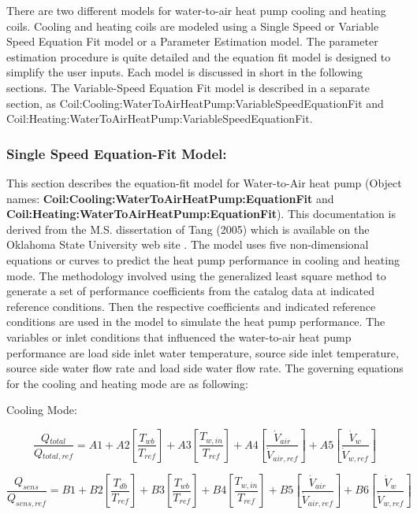 There are two different models for water-to-air heat pump cooling and heating coils. Cooling and heating coils are modeled using a Single Speed or Variable Speed Equation Fit model or a Parameter Estimation model. The parameter estimation procedure is quite detailed and the equation fit model is designed to simplify the user inputs. Each model is discussed in short in the following sections. The Variable-Speed Equation Fit model is described in a separate section, as Coil:Cooling:WaterToAirHeatPump:VariableSpeedEquationFit and Coil:Heating:WaterToAirHeatPump:VariableSpeedEquationFit.

\subsubsection{Single Speed Equation-Fit Model:}\label{single-speed-equation-fit-model}

This section describes the equation-fit model for Water-to-Air heat pump (Object names: \textbf{Coil:Cooling:WaterToAirHeatPump:EquationFit} and \\ \textbf{Coil:Heating:WaterToAirHeatPump:EquationFit}). This documentation is derived from the M.S. dissertation of Tang (2005) which is available on the Oklahoma State University web site . The model uses five non-dimensional equations or curves to predict the heat pump performance in cooling and heating mode. The methodology involved using the generalized least square method to generate a set of performance coefficients from the catalog data at indicated reference conditions. Then the respective coefficients and indicated reference conditions are used in the model to simulate the heat pump performance. The variables or inlet conditions that influenced the water-to-air heat pump performance are load side inlet water temperature, source side inlet temperature, source side water flow rate and load side water flow rate. The governing equations for the cooling and heating mode are as following:

Cooling Mode:

\begin{equation}
\frac{{Q{}_{total}}}{{Q{}_{total,ref}}} = A1 + A2\left[ {\frac{{{T_{wb}}}}{{{T_{ref}}}}} \right] + A3\left[ {\frac{{T{}_{w,in}}}{{T{}_{ref}}}} \right] + A4\left[ {\frac{{{{\dot V}_{air}}}}{{{{\dot V}_{air,ref}}}}} \right] + A5\left[ {\frac{{{{\dot V}_w}}}{{{{\dot V}_{w,ref}}}}} \right]
\end{equation}

\begin{equation}
\frac{{{Q_{sens}}}}{{{Q_{sens,ref}}}} = B1 + B2\left[ {\frac{{T{}_{db}}}{{T{}_{ref}}}} \right] + B3\left[ {\frac{{T{}_{wb}}}{{T{}_{ref}}}} \right] + B4\left[ {\frac{{T{}_{w,in}}}{{T{}_{ref}}}} \right] + B5\left[ {\frac{{{{\dot V}_{air}}}}{{{{\dot V}_{air,ref}}}}} \right] + B6\left[ {\frac{{\dot V{}_w}}{{\dot V{}_{w,ref}}}} \right]
\end{equation}

